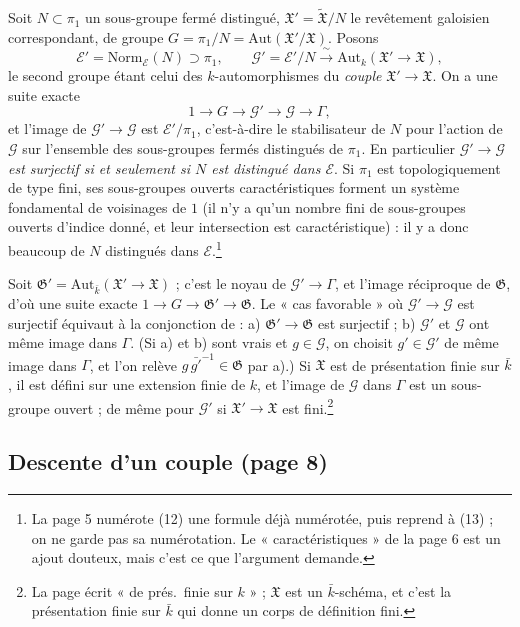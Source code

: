 \documentclass[11pt,a4paper]{article}
\begin{document}
Soit $N \subset \pi_{1}$ un sous-groupe fermé distingué,
$\mathfrak{X}' = \widetilde{\mathfrak{X}}/N$ le revêtement galoisien
correspondant, de groupe $G = \pi_{1}/N = \mathrm{Aut}(\mathfrak{X}'/\mathfrak{X})$.
Posons
\[
\mathcal{E}' = \mathrm{Norm}_{\mathcal{E}}(N) \supset \pi_{1},
\qquad
\mathcal{G}' = \mathcal{E}'/N \xrightarrow{\;\sim\;}
\mathrm{Aut}_{k}(\mathfrak{X}' \to \mathfrak{X}),
\]
le second groupe étant celui des $k$-automorphismes du \emph{couple}
$\mathfrak{X}' \to \mathfrak{X}$. On a une suite exacte
\[
1 \to G \to \mathcal{G}' \to \mathcal{G} \to \Gamma,
\]
et l'image de $\mathcal{G}' \to \mathcal{G}$ est $\mathcal{E}'/\pi_{1}$,
c'est-à-dire le stabilisateur de $N$ pour l'action de $\mathcal{G}$ sur
l'ensemble des sous-groupes fermés distingués de $\pi_{1}$. En particulier
\emph{$\mathcal{G}' \to \mathcal{G}$ est surjectif si et seulement si $N$ est
distingué dans $\mathcal{E}$}. Si $\pi_{1}$ est topologiquement de type fini,
ses sous-groupes ouverts caractéristiques forment un système fondamental de
voisinages de $1$ (il n'y a qu'un nombre fini de sous-groupes ouverts d'indice
donné, et leur intersection est caractéristique) : il y a donc beaucoup de $N$
distingués dans $\mathcal{E}$.\footnote{La page 5 numérote (12) une formule
déjà numérotée, puis reprend à (13) ; on ne garde pas sa numérotation. Le
« caractéristiques » de la page 6 est un ajout douteux, mais c'est ce que
l'argument demande.}

Soit $\mathfrak{G}' = \mathrm{Aut}_{\bar{k}}(\mathfrak{X}' \to \mathfrak{X})$ ;
c'est le noyau de $\mathcal{G}' \to \Gamma$, et l'image réciproque de
$\mathfrak{G}$, d'où une suite exacte $1 \to G \to \mathfrak{G}' \to
\mathfrak{G}$. Le « cas favorable » où $\mathcal{G}' \to \mathcal{G}$ est
surjectif équivaut à la conjonction de : a) $\mathfrak{G}' \to \mathfrak{G}$
est surjectif ; b) $\mathcal{G}'$ et $\mathcal{G}$ ont même image dans
$\Gamma$. (Si a) et b) sont vrais et $g \in \mathcal{G}$, on choisit $g' \in
\mathcal{G}'$ de même image dans $\Gamma$, et l'on relève $g\,\bar{g'}^{-1} \in
\mathfrak{G}$ par a).) Si $\mathfrak{X}$ est de présentation finie sur
$\bar{k}$, il est défini sur une extension finie de $k$, et l'image de
$\mathcal{G}$ dans $\Gamma$ est un sous-groupe ouvert ; de même pour
$\mathcal{G}'$ si $\mathfrak{X}' \to \mathfrak{X}$ est fini.\footnote{La page
écrit « de prés.\ finie sur $k$ » ; $\mathfrak{X}$ est un $\bar{k}$-schéma, et
c'est la présentation finie sur $\bar{k}$ qui donne un corps de définition
fini.}

\subsection*{Descente d'un couple (page 8)}
\end{document}
